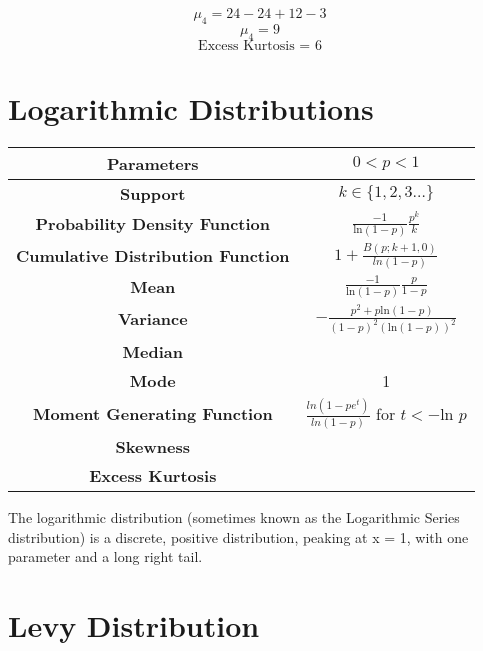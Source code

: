 \documentclass[14pt, a4paper]{article}
\theoremstyle{definition}
\begin{document}
\[\mu_4 = 24 - 24 +12 -3\]
\[\mu_4 = 9\]
\[\text{Excess Kurtosis = } 6\]
  
\section{Logarithmic Distributions}

\begin{center}
    \begin{tabular}{|c|c|}  %
\hline
 \textbf{Parameters }&  $ 0 < p < 1$\\
 \hline
 \textbf{Support} & $k \in \{ 1, 2, 3 \dots \}$ \\
 \hline
 \textbf{Probability Density Function} &  $\frac{-1}{\text{ln}(1-p)} \frac{p^k}{k}$ \\
 \hline
 \textbf{Cumulative Distribution Function} & $ 1 + \frac{B(p ;k+1,0)}{ln(1-p)}$ \\
 \hline
 \textbf{Mean} & $\frac{-1}{\text{ln}(1-p)} \frac{p}{1-p}$ \\ 
 \hline
 \textbf{Variance} & $- \frac{p^2 + p \text{ln}(1-p)}{(1-p)^2 (\text{ln}(1-p))^2}$ \\
 \hline
 \textbf{Median} &  \\ 
 \hline
 \textbf{Mode} & 1 \\
 \hline
 \textbf{Moment Generating Function} & $\frac{ln(1 - pe^t)}{ln (1-p)}$ for $t < - \text{ln } p $\\
 \hline
 \textbf{Skewness} & \\
 \hline
 \textbf{Excess Kurtosis} &   \\
 \hline
 
       
  \end{tabular}
\end{center}

  
The logarithmic distribution (sometimes known as the Logarithmic Series distribution) is a discrete, positive distribution, peaking at x = 1, with one parameter and a long right tail. 
  
  
\section{Levy Distribution}
\end{document}
